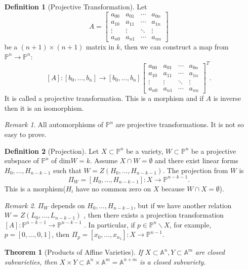 \documentclass{amsart}
\theoremstyle{plain}
\newtheorem{theorem}{Theorem}
\theoremstyle{definition}
\newtheorem{definition}{Definition}
\theoremstyle{remark}
\newtheorem*{remark}{Remark}
\numberwithin{equation}{section}
\begin{document}
\begin{definition}[Projective Transformation]
	Let \begin{equation}
	A=\left[\begin{matrix}
	a_{00} & a_{01} & \cdots & a_{0n}\\
	a_{10} & a_{11} & \cdots & a_{1n}\\
	\vdots & \vdots & \ddots & \vdots\\
	a_{n0} & a_{n1} & \cdots & a_{nn}
	\end{matrix}\right]
	\end{equation}
	be a $ (n+1)\times (n+1) $ matrix  in $ k $, then we can construct a map from $ \mathbb{P}^n  \to  \mathbb{P}^n $:
	$$
	[A]:	[b_0,\dots,b_n]\to [b_0,\dots,b_n]\left[\begin{matrix}
	a_{00} & a_{01} & \cdots & a_{0n}\\
	a_{10} & a_{11} & \cdots & a_{1n}\\
	\vdots & \vdots & \ddots & \vdots\\
	a_{n0} & a_{n1} & \cdots & a_{nn}
	\end{matrix}\right]^{T}.
	$$
	It is called a projective transformation. This is a morphism and if $ A $ is inverse then it is an isomorphism.
\end{definition}
\begin{remark}
	All automorphisms of $ \mathbb{P}^n $  are projective transformations. It is not so easy to prove.
\end{remark}
\begin{definition}[Projection]
	Let $ X\subset\mathbb{P}^n  $ be a variety, $ W\subset \mathbb{P}^n $ be a projective subspace of $ \mathbb{P}^n $ of $ \text{dim}W=k $. Assume $ X\cap W= \emptyset $ and there exist linear forms $ H_0,\dots,H_{n-k-1} $ such that $ W=Z(H_0,\dots,H_{n-k-1}) $. The projection from $ W $ is
	$$
	\Pi_W=[H_0,\dots,H_{n-k-1}]:X\to \mathbb{P}^{n-k-1}.
	$$
	This is a morphism($ H_i $ have no common zero on $ X $ because $ W\cap X=\emptyset $).
\end{definition}
\begin{remark}
	$ \Pi_W $ depends on $ H_0,\dots,H_{n-k-1} $, but if we have another relation $ W=Z(L_0,\dots,L_{n-k-1}) $ , then there exists a projection transformation $ [A]:\mathbb{P}^{n-k-1}\to \mathbb{P}^{n-k-1} $ . In particular, if $ p\in \mathbb{P}^n\backslash X $, for example, $ p=[0,\dots,0,1] $, then $ \Pi_p=[x_0,\dots,x_{n_1}] :X\to \mathbb{P}^{n-1}$.
\end{remark}
\begin{theorem}[Products of Affine Varieties]\label{15}
	If $ X\subset \mathbb{A}^n,Y\subset \mathbb{A}^m $ are closed subvarieties, then $ X\times Y\subset \mathbb{A}^n\times \mathbb{A}^m=\mathbb{A}^{n+m} $ is a closed subvariety.
\end{theorem}
\end{document}
